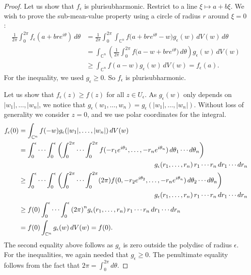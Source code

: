 \documentclass[12pt,openany]{book}
\newcommand{\sabs}[1]{\lvert {#1} \rvert}
\newcommand{\C}{{\mathbb{C}}}
\theoremstyle{plain}
\theoremstyle{remark}
\theoremstyle{definition}
\theoremstyle{exercise}
\theoremstyle{example}
\begin{document}
\begin{proof}
\pagebreak[1]
Let us show that $f_\epsilon$ is plurisubharmonic.
Restrict to a line $\xi \mapsto a+b\xi$.
We wish to prove the sub-mean-value property using a circle
of radius $r$ around $\xi = 0$:
\begin{equation*}
\begin{split}
\frac{1}{2\pi} \int_0^{2\pi} f_\epsilon(a+bre^{i\theta})\, d\theta & =
\frac{1}{2\pi} \int_0^{2\pi}
\int_{\C^n}
f\bigl(a+bre^{i\theta}-w\bigr) g_\epsilon (w) \, dV(w)
\,d\theta
\\
& =
\int_{\C^n}
\left(
\frac{1}{2\pi} \int_0^{2\pi}
f\bigl(a-w+bre^{i\theta}\bigr) \, d\theta \right) g_\epsilon (w) \, dV(w)
\\
& \geq
\int_{\C^n}
f(a-w) g_\epsilon (w) \, dV(w)  = f_\epsilon(a).
\end{split}
\end{equation*}
For the inequality, we used $g_\epsilon \geq 0$.
So $f_\epsilon$ is plurisubharmonic.

Let us show that $f_\epsilon(z) \geq f(z)$ for all $z \in U_\epsilon$.
As $g_\epsilon(w)$ only depends on $\sabs{w_1},\ldots,\sabs{w_n}$, we notice
that
$g_\epsilon(w_1,\ldots,w_n) =
g_\epsilon(\sabs{w_1},\ldots,\sabs{w_n})$.
Without loss of generality we consider $z=0$, and we use polar coordinates
for the integral.
\pagebreak[1]
\begin{equation*}
\begin{split}
f_\epsilon(0)
& =
\int_{\C^n} f(-w) g_\epsilon (\sabs{w_1},\ldots,\sabs{w_n})
\, dV(w)
\\
& =
\int_0^\epsilon \cdots
\int_0^\epsilon
\left(
\int_0^{2\pi}
\cdots
\int_0^{2\pi}
 f(-r_1e^{i\theta_1},\ldots,
-r_ne^{i\theta_n}) \,
d\theta_1 \cdots d\theta_n \right)
\\
& \hspace{2.8in}
g_\epsilon (r_1,\ldots,r_n) \,
 r_1 \cdots r_n \,d r_1 \cdots d r_n
\\
& \geq
\int_0^\epsilon \cdots
\int_0^\epsilon
\left(
\int_0^{2\pi}
\cdots
\int_0^{2\pi}
(2\pi)
 f(0,-r_2e^{i\theta_2},\ldots,
-r_ne^{i\theta_n}) \,
d\theta_2 \cdots d\theta_n \right)
\\
& \hspace{2.8in}
g_\epsilon (r_1,\ldots,r_n) \,
 r_1 \cdots r_n \,d r_1 \cdots d r_n
\\
& \geq
f(0)
\int_0^\epsilon \cdots
\int_0^\epsilon
{(2\pi)}^n
g_\epsilon (r_1,\ldots,r_n) \,
 r_1 \cdots r_n \,d r_1 \cdots d r_n
\\
& = f(0) \int_{\C^n} g_\epsilon (w) \, dV(w)
= f(0) .
\end{split}
\end{equation*}
The second equality above
follows as $g_\epsilon$ is zero
outside the polydisc of radius $\epsilon$.
For the inequalities, we again needed that $g_\epsilon \geq 0$.
The penultimate equality follows from the fact that
$2\pi = \int_0^{2\pi}d \theta$.


\end{proof}
\end{document}
